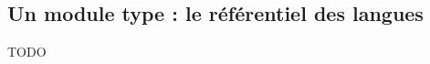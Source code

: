 \subsection{Un module type : le référentiel des langues}
\label{section:eyrolles_ref-langues}

TODO
